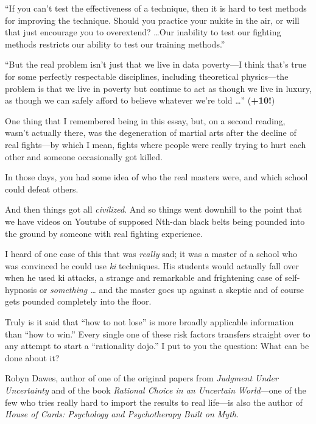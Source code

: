 {
 ``If you can't test the
effectiveness of a technique, then it is hard to test methods for
improving the technique. Should you practice your nukite in the air, or
will that just encourage you to overextend? \ldots Our inability to test
our fighting methods restricts our ability to test our training
methods.''}

{
 ``But the real problem isn't just
that we live in data poverty---I think that's true for
some perfectly respectable disciplines, including theoretical
physics---the problem is that we live in poverty but continue to act as
though we live in luxury, as though we can safely afford to believe
whatever we're told \ldots''
(\textbf{+10!})}

{
 One thing that I remembered being in this essay, but, on a second
reading, wasn't actually there, was the degeneration of
martial arts after the decline of real fights---by which I mean, fights
where people were really trying to hurt each other and someone
occasionally got killed.}

{
 In those days, you had some idea of who the real masters were, and
which school could defeat others.}

{
 And then things got all \textit{civilized}. And so things went
downhill to the point that we have videos on Youtube of supposed
Nth-dan black belts being pounded into the ground by someone with real
fighting experience.}

{
 I heard of one case of this that was \textit{really} sad; it was a
master of a school who was convinced he could use \textit{ki}
techniques. His students would actually fall over when he used ki
attacks, a strange and remarkable and frightening case of self-hypnosis
or \textit{something \ldots} and the master goes up against a skeptic
and of course gets pounded completely into the floor.}

{
 Truly is it said that ``how to not
lose'' is more broadly applicable information than
``how to win.'' Every single one of
these risk factors transfers straight over to any attempt to start a
``rationality dojo.'' I put to you
the question: What can be done about it?}

\myendsectiontext


\bigskip


{
 Robyn Dawes, author of one of the original papers from
\textit{Judgment Under Uncertainty} and of the book \textit{Rational
Choice in an Uncertain World}{}---one of the few who tries really hard
to import the results to real life---is also the author of
\textit{House of Cards: Psychology and Psychotherapy Built on Myth.} }

